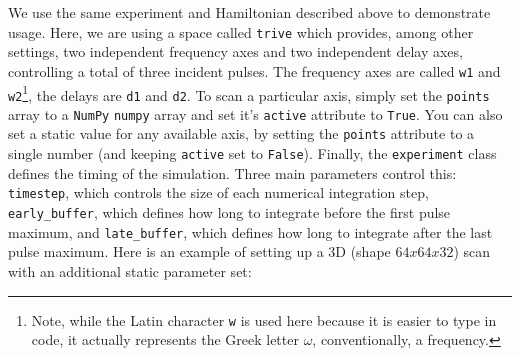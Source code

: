 We use the same experiment and Hamiltonian described above to
demonstrate usage. Here, we are using a space called \texttt{trive}
which provides, among other settings, two independent frequency axes and
two independent delay axes, controlling a total of three incident
pulses. The frequency axes are called \texttt{w1} and
\texttt{w2}\footnote{Note, while the Latin character \texttt{w} is used
  here because it is easier to type in code, it actually represents the
  Greek letter \(\omega\), conventionally, a frequency.}, the delays are
\texttt{d1} and \texttt{d2}. To scan a particular axis, simply set the
\texttt{points} array to a \texttt{NumPy} \texttt{numpy} array and set
it's \texttt{active} attribute to \texttt{True}. You can also set a
static value for any available axis, by setting the \texttt{points}
attribute to a single number (and keeping \texttt{active} set to
\texttt{False}). Finally, the \texttt{experiment} class defines the
timing of the simulation. Three main parameters control this:
\texttt{timestep}, which controls the size of each numerical integration
step, \texttt{early\_buffer}, which defines how long to integrate before
the first pulse maximum, and \texttt{late\_buffer}, which defines how
long to integrate after the last pulse maximum. Here is an example of
setting up a 3D (shape \(64x64x32\)) scan with an additional static
parameter set:

